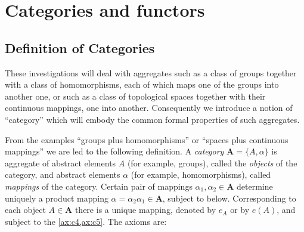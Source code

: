 \documentclass[11pt,a4paper]{report}
\newtheorem{axiom}{Axiom}
\begin{document}
\chapter{Categories and functors}\label{ch:cat_funct}
\section{Definition of Categories}\label{sec:def_cat}
These investigations will deal with aggregates such as a class of groups together with a class of homomorphisms,
each of which maps one of the groups into another one, or such as a class of topological spaces together with 
their continuous mappings, one into another. Consequently we introduce a notion of ``category'' which will
embody the common formal properties of such aggregates.

From the examples ``groups plus homomorphisms'' or ``spaces plus continuous mappings'' we are led to the following
definition. A \emph{category} $\mathbf{A}=\{A,\alpha\}$ is aggregate of abstract elements $A$ (for example, groups),
called the \emph{objects} of the category, and abstract elements $\alpha$ (for example, homomorphisms), called 
\emph{mappings} of the category. Certain pair of mappings $\alpha_1,\alpha_2\in\mathbf{A}$ determine uniquely a
product mapping $\alpha=\alpha_2\alpha_1\in\mathbf{A}$, subject to  below. Corresponding
to each object $A\in\mathbf{A}$ there is a unique mapping, denoted by $e_A$ or by $e(A)$, and subject to the
\cref{ax:c4,ax:c5}. The axioms are:
\theoremstyle{definition}
\end{document}
